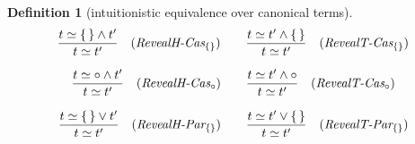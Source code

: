 \documentclass[12pt]{article}
\newtheorem{Definition}{Definition}[section]
\begin{document}
\begin{Definition}[intuitionistic equivalence over canonical terms]
\begin{displaymath}
\begin{array}{c}
      \begin{array}{ll}
        \begin{array}{rl}
          \dfrac{ t \simeq \{\,\} \wedge t' }{
            t \simeq t'
          }  &  (\text{\it RevealH-Cas}_{\{\}})
        \end{array}
        & \begin{array}{rl}
            \dfrac{ t \simeq t' \wedge \{\,\} }{
              t \simeq t'
            }  &  (\text{\it RevealT-Cas}_{\{\}})
          \end{array}
      \end{array}
      
    \end{array}
  \end{displaymath}
  
  \begin{displaymath}
    \begin{array}{c}
      
      \begin{array}{ll}
        \begin{array}{rl}
          \dfrac{ t \simeq \circ \wedge t' }{
            t \simeq t'
          }  &  (\text{\it RevealH-Cas}_\circ)
        \end{array}
        & \begin{array}{rl}
            \dfrac{ t \simeq t' \wedge \circ }{
              t \simeq t'
            }  &  (\text{\it RevealT-Cas}_\circ)
          \end{array}
      \end{array}  \\
      \\
            
      \begin{array}{ll}
        \begin{array}{rl}
          \dfrac{ t \simeq \{\,\} \vee t' }{
            t \simeq t'
          }  &  (\text{\it RevealH-Par}_{\{\}})
        \end{array}
        & \begin{array}{rl}
            \dfrac{ t \simeq t' \vee \{\,\} }{
              t \simeq t'
            }  &  (\text{\it RevealT-Par}_{\{\}})
          \end{array}
      \end{array}  \\
      \\


\end{array}
\end{displaymath}
\end{Definition}
\end{document}
